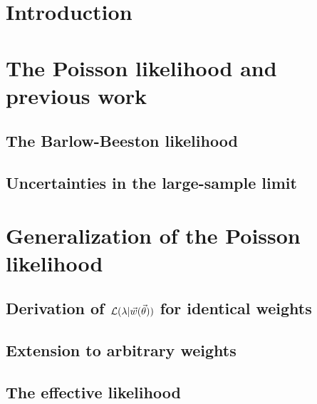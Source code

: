 



\maketitle

\section{Introduction\label{sec:intro}}


\section{The Poisson likelihood and previous work\label{sec:mc_intro}}


\subsection{The Barlow-Beeston likelihood}


\subsection{Uncertainties in the large-sample limit}


\section{Generalization of the Poisson likelihood\label{sec:generalization_poisson}}


\subsection{Derivation of $\mathcal{L} (\lambda|\vec{w}(\vec{\theta}))$ for identical weights\label{sec:constructing}}


\subsection{Extension to arbitrary weights\label{sec:extending}}


\subsection{The effective likelihood\label{sec:effective}}


